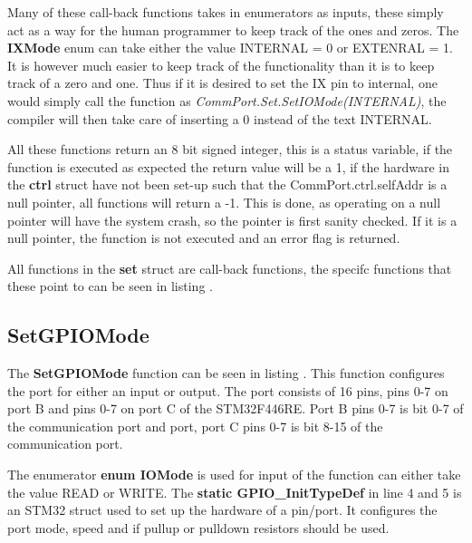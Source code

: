 Many of these call-back functions takes in enumerators as inputs, these simply act as a way for the human programmer to keep track of the ones and zeros. The \textbf{IXMode} enum can take either the value INTERNAL = 0 or EXTENRAL = 1. It is however much easier to keep track of the functionality than it is to keep track of a zero and one. Thus if it is desired to set the IX pin to internal, one would simply call the function as \textit{CommPort.Set.SetIOMode(INTERNAL)}, the compiler will then take care of inserting a 0 instead of the text INTERNAL. 

All these functions return an 8 bit signed integer, this is a status variable, if the function is executed as expected the return value will be a 1, if the hardware in the \textbf{ctrl} struct have not been set-up such that the CommPort.ctrl.selfAddr is a null pointer, all functions will return a -1. This is done, as operating on a null pointer will have the system crash, so the pointer is first sanity checked. If it is a null pointer, the function is not executed and an error flag is returned.

All functions in the \textbf{set} struct are call-back functions, the specifc functions that these point to can be seen in listing .


\subsection*{SetGPIOMode}
The \textbf{SetGPIOMode} function can be seen in listing . This function configures the port for either an input or output. The port consists of 16 pins, pins 0-7 on port B and pins 0-7 on port C of the STM32F446RE. Port B pins 0-7 is bit 0-7 of the communication port and port, port C pins 0-7 is bit 8-15 of the communication port.


The enumerator \textbf{enum IOMode} is used for input of the function can either take the value READ or WRITE. The \textbf{static GPIO\_InitTypeDef} in line 4 and 5 is an STM32 struct used to set up the hardware of a pin/port. It configures the port mode, speed and if pullup or pulldown resistors should be used.


